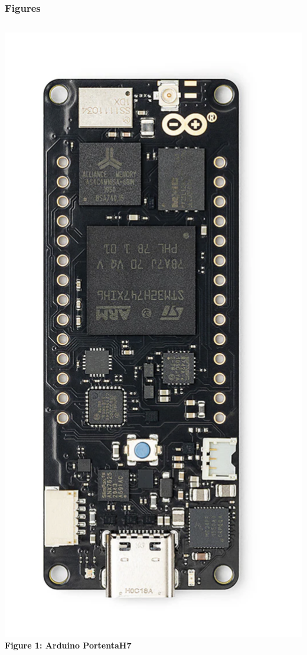 \documentclass[10pt, a4paper]{beamer}
\begin{document}
	\begin{frame}
		\frametitle{Figures}
		
		\begin{columns}
			\centering
			\includegraphics[width=\textwidth]{images/ArduinoPortentaH7.png}
			\vspace{0.2cm}
			\textbf{Figure 1: Arduino PortentaH7}
			

\end{columns}
\end{frame}
\end{document}
